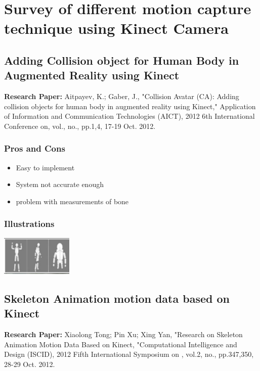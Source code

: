 \documentclass[a4paper,10pt]{report}
\title {\strong{Week 1 Update}}
\author{Rajat Saxena}
\begin{document}
\maketitle

\section{Survey of different motion capture technique using Kinect Camera}

\subsection{Adding Collision object for Human Body in Augmented Reality using Kinect}
\textbf{Research Paper:} Aitpayev, K.; Gaber, J., "Collision Avatar (CA): Adding collision objects for human body in augmented reality using Kinect," Application of Information and Communication Technologies (AICT), 2012 6th International Conference on, vol., no., pp.1,4, 17-19 Oct. 2012.
\subsubsection{Pros and Cons}
\begin{itemize}
 \item Easy to implement
 \item System not accurate enough
 \item problem with measurements of bone
\end{itemize}
\subsubsection{Illustrations}\newline\newline
\includegraphics{./tech1.png}
\newline\newline

\subsection{Skeleton Animation motion data based on Kinect}
\textbf{Research Paper:} Xiaolong Tong; Pin Xu; Xing Yan, "Research on Skeleton Animation Motion Data Based on Kinect, "Computational Intelligence and Design (ISCID), 2012 Fifth International Symposium on , vol.2, no., pp.347,350, 28-29 Oct. 2012.
\end{document}
